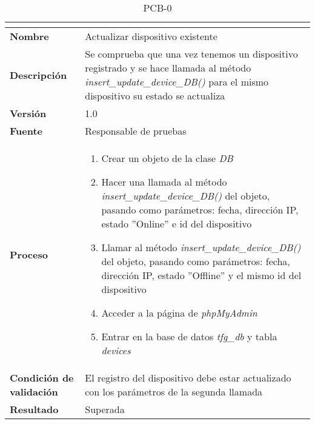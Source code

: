 \begin{table}[H]
	\caption{PCB-0\number\pcb}
	\begin{tabular}{|l|p{}|}
		\hline
		\multicolumn{2}{|c|}{\cellcolor[HTML]{BFBFBF}{\color[HTML]{000000} \textbf{PCB-0\number\pcb}}} \\ \hline
		\textbf{Nombre}                  & Actualizar dispositivo existente                                                                                                                                              \\ \hline
		\textbf{Descripción}             & Se comprueba que una vez tenemos un dispositivo registrado y se hace llamada al método \textit{insert\_update\_device\_DB()} para el mismo dispositivo su estado se actualiza \\ \hline
		\textbf{Versión}                 & 1.0                                                                                                                                                                           \\ \hline
		\textbf{Fuente}                  & Responsable de pruebas                                                                                                                                                        \\ \hline
		\textbf{Proceso}                 & \begin{enumerate}
			\item Crear un objeto de la clase \textit{DB}
			\item Hacer una llamada al método \textit{insert\_update\_device\_DB()} del objeto, pasando como parámetros: fecha, dirección IP, estado ''Online'' e id del dispositivo
			\item Llamar al método \textit{insert\_update\_device\_DB()} del objeto, pasando como parámetros: fecha, dirección IP, estado ''Offline'' y el mismo id del dispositivo
			\item Acceder a la página de \textit{phpMyAdmin}
			\item Entrar en la base de datos \textit{tfg\_db} y tabla \textit{devices}
		\end{enumerate}                                                                                                                                                     \\ \hline
		\textbf{Condición de validación} & El registro del dispositivo debe estar actualizado con los parámetros de la segunda llamada                                                                                   \\ \hline
		\textbf{Resultado}               & Superada                                                                                                                                                                      \\ \hline
	\end{tabular}
\end{table}
